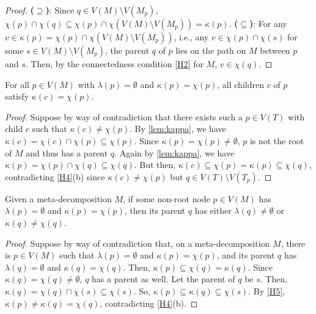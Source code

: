 \begin{proof}
\textbf{($\supseteq$)}: Since $q \in V(M) \setminus V(M_p)$, $\chi(p) \cap \chi(q) \subseteq \chi(p) \cap \chi(V(M) \setminus V(M_p)) = \kappa(p)$.
\textbf{($\subseteq$)}: For any $v \in \kappa(p) = \chi(p) \cap \chi(V(M) \setminus V(M_p))$, i.e., any $v \in \chi(p) \cap \chi(s)$ for some $s \in V(M) \setminus V(M_p)$, the parent $q$ of $p$ lies on the path on $M$ between $p$ and $s$. Then, by the connectedness condition \ref{H2} for $M$, $v \in \chi(q)$.
\end{proof}

\begin{lemma} \label{lem:minor-all-origin}
    For all $p \in V(M)$ with $\lambda(p) = \emptyset$ and $\kappa(p) = \chi(p)$, all children $c$ of $p$ satisfy $\kappa(c) = \chi(p)$.
\end{lemma}
\begin{proof}
    Suppose by way of contradiction that there exists such a $p \in V(T)$ with child $c$ such that $\kappa(c) \neq \chi(p)$. By \cref{lem:kappa}, we have $\kappa(c) = \chi(c) \cap \chi(p) \subseteq \chi(p)$. Since $\kappa(p) = \chi(p) \neq \emptyset$, $p$ is not the root of $M$ and thus has a parent $q$. Again by \cref{lem:kappa}, we have $\kappa(p) = \chi(p) \cap \chi(q) \subseteq \chi(q)$. But then, $\kappa(c) \subseteq \chi(p) = \kappa(p) \subseteq \chi(q)$, contradicting \ref{H4}(b) since $\kappa(c) \neq \chi(p)$ but $q \in V(T) \setminus V(T_p)$.
\end{proof}


\begin{lemma} \label{lem:no-consec-special-minor}
    Given a meta-decomposition $M$, if some non-root node $p \in V(M)$ has $\lambda(p) = \emptyset$ and $\kappa(p) = \chi(p)$, then its parent $q$ has either $\lambda(q) \neq \emptyset$ or $\kappa(q) \neq \chi(q)$.
\end{lemma}

\begin{proof}
    Suppose by way of contradiction that, on a meta-decomposition $M$, there is $p \in V(M)$ such that $\lambda(p) = \emptyset$ and $\kappa(p) = \chi(p)$, and its parent $q$ has $\lambda(q) = \emptyset$ and $\kappa(q) = \chi(q)$.
    Then, $\kappa(p) \subseteq \chi(q) = \kappa(q)$. Since $\kappa(q) = \chi(q) \neq \emptyset$, $q$ has a parent as well. Let the parent of $q$ be $s$. Then, $\kappa(q) = \chi(q) \cap \chi(s) \subseteq \chi(s)$. So, $\kappa(p) \subseteq \kappa(q) \subseteq \chi(s)$. By \ref{H5}, $\kappa(p) \neq \kappa(q) = \chi(q)$, contradicting \ref{H4}(b).
\end{proof}

